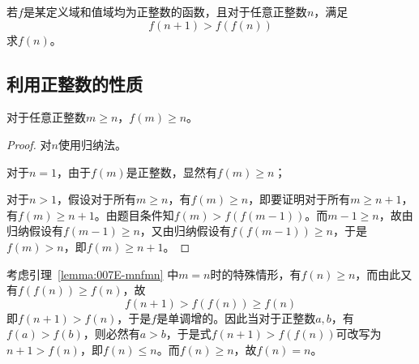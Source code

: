 

若$f$是某定义域和值域均为正整数的函数，且对于任意正整数$n$，满足
\[ f(n + 1) > f(f(n)) \]
求$f(n)$。


\subsection{利用正整数的性质}

\begin{lemma} \label{lemma:007E-mnfmn}
  对于任意正整数$m \ge n$，$f(m) \ge n$。
\end{lemma}

\begin{proof}
  对$n$使用归纳法。

  对于$n = 1$，由于$f(m)$是正整数，显然有$f(m) \ge n$；

  对于$n > 1$，假设对于所有$m \ge n$，有$f(m) \ge n$，即要证明对于所有$m \ge n + 1$，有$f(m) \ge n + 1$。由题目条件知$f(m) > f(f(m - 1))$。而$m - 1 \ge n$，故由归纳假设有$f(m - 1) \ge n$，又由归纳假设有$f(f(m - 1)) \ge n$，于是$f(m) > n$，即$f(m) \ge n + 1$。
\end{proof}

考虑引理~\ref{lemma:007E-mnfmn} 中$m = n$时的特殊情形，有$f(n) \ge n$，而由此又有$f(f(n)) \ge f(n)$，故
\[ f(n + 1) > f(f(n)) \ge f(n) \]
即$f(n + 1) > f(n)$，于是$f$是单调增的。因此当对于正整数$a, b$，有$f(a) > f(b)$，则必然有$a > b$，于是式$f(n + 1) > f(f(n))$可改写为$n + 1 > f(n)$，即$f(n) \le n$。而$f(n) \ge n$，故$f(n) = n$。
